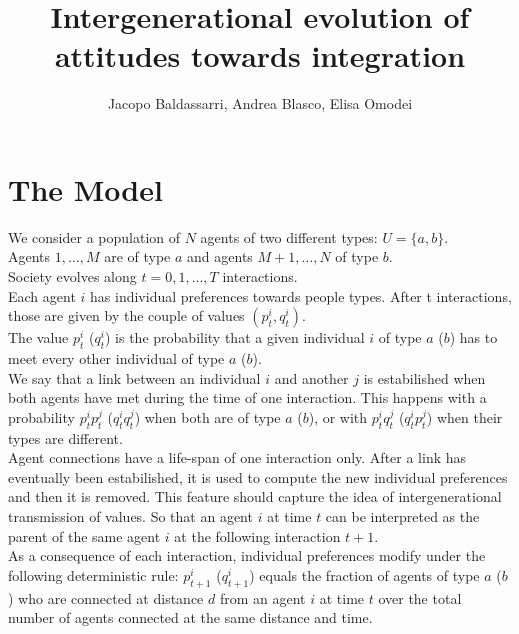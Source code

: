 \documentclass[a4paper,10pt]{article}
\title{Intergenerational evolution of attitudes towards integration}
\author{Jacopo Baldassarri, Andrea Blasco, Elisa Omodei}
\begin{document}
\maketitle

\section{The Model}
We consider a population of $N$ agents of two different types: $U = \{a,b\}$.\\
Agents $1,\dots,M$ are of type $a$ and agents $M+1,\dots,N$ of type $b$.\\
Society evolves along $t=0,1,..., T$ interactions.\\
Each agent $i$ has individual preferences towards people types. After t interactions, those are given by the couple of values $(p_t^i, q_t^i)$.\\
The value $p_t^i$ ($q_t^i$) is the probability that a given individual $i$ of type $a$ ($b$) has to meet every other individual of type $a$ ($b$).\\
We say that a link between an individual $i$ and another $j$ is estabilished when both agents have met during the time of one interaction. This happens with a probability $p_t^i p_t^j$ ($q_t^i q_t^j$) when both are of type $a$ ($b$), or with $p_t^i q_t^j$ ($q_t^i p_t^j$) when their types are different.\\
Agent connections have a life-span of one interaction only. After a link has eventually been estabilished, it is used to compute the new individual preferences and then it is removed. This feature should capture the idea of intergenerational transmission of values. So that an agent $i$ at time $t$ can be interpreted as the parent of the same agent $i$ at the following interaction $t+1$.\\
As a consequence of each interaction, individual preferences modify under the following deterministic rule: $p_{t+1}^i$ ($q_{t+1}^i$) equals the fraction of agents of type $a$ ($b$) who are connected at distance $d$ from an agent $i$ at time $t$ over the total number of agents connected at the same distance and time.\\
\end{document}

